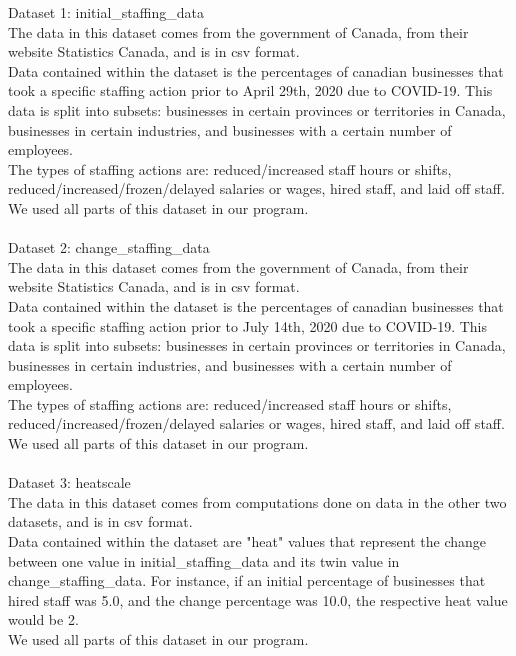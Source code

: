 \documentclass[fontsize=11pt]{article}
\begin{document}
    Dataset 1: initial\_staffing\_data
    \\
    The data in this dataset comes from the government of Canada, from their website Statistics Canada, and is in csv format.
    \\
    Data contained within the dataset is the percentages of canadian businesses that took a specific staffing action prior to April 29th, 2020 due to COVID-19. This data is split into subsets: businesses in certain provinces or territories in Canada, businesses in certain industries, and businesses with a certain number of employees.
    \\
    The types of staffing actions are: reduced/increased staff hours or shifts, reduced/increased/frozen/delayed salaries or wages, hired staff, and laid off staff.
    \\
    We used all parts of this dataset in our program.
    \\
    \\
    Dataset 2: change\_staffing\_data
    \\
    The data in this dataset comes from the government of Canada, from their website Statistics Canada, and is in csv format.
    \\
    Data contained within the dataset is the percentages of canadian businesses that took a specific staffing action prior to July 14th, 2020 due to COVID-19. This data is split into subsets: businesses in certain provinces or territories in Canada, businesses in certain industries, and businesses with a certain number of employees.
    \\
    The types of staffing actions are: reduced/increased staff hours or shifts, reduced/increased/frozen/delayed salaries or wages, hired staff, and laid off staff.
    \\
    We used all parts of this dataset in our program.
    \\
    \\
    Dataset 3: heatscale
    \\
    The data in this dataset comes from computations done on data in the other two datasets, and is in csv format.
    \\
    Data contained within the dataset are "heat" values that represent the change between one value in initial\_staffing\_data and its twin value in change\_staffing\_data. For instance, if an initial percentage of businesses that hired staff was 5.0, and the change percentage was 10.0, the respective heat value would be 2.
    \\
    We used all parts of this dataset in our program.
\end{document}

